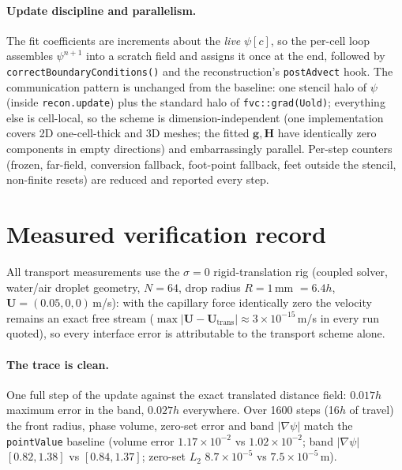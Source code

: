 \documentclass[preprint,3p,11pt]{elsarticle}
\newcommand{\psilev}{\psi}
\newcommand{\gv}{\mathbf{g}}
\newcommand{\Hm}{\mathbf{H}}
\newcommand{\gradpsi}{\lvert\nabla\psilev\rvert}
\begin{document}
\paragraph{Update discipline and parallelism.} The fit coefficients are
increments about the \emph{live} $\psilev[c]$, so the per-cell loop assembles
$\psilev^{n+1}$ into a scratch field and assigns it once at the end, followed
by \texttt{correctBoundaryConditions()} and the reconstruction's
\texttt{postAdvect} hook. The communication pattern is unchanged from the
baseline: one stencil halo of $\psilev$ (inside \texttt{recon.update}) plus
the standard halo of \texttt{fvc::grad(Uold)}; everything else is cell-local,
so the scheme is dimension-independent (one implementation covers 2D
one-cell-thick and 3D meshes; the fitted $\gv,\Hm$ have identically zero
components in empty directions) and embarrassingly parallel. Per-step counters
(frozen, far-field, conversion fallback, foot-point fallback, feet outside the
stencil, non-finite resets) are reduced and reported every step.

\section{Measured verification record}
\label{sec:results}

All transport measurements use the $\sigma=0$ rigid-translation rig (coupled
solver, water/air droplet geometry, $N=64$, drop radius $R=1$\,mm $=6.4h$,
$\mathbf U=(0.05,0,0)$\,m/s): with the capillary force identically zero the
velocity remains an exact free stream ($\max\lvert\mathbf U-\mathbf
U_{\mathrm{trans}}\rvert\approx3\times10^{-15}$\,m/s in every run quoted), so
every interface error is attributable to the transport scheme alone.

\paragraph{The trace is clean.} One full step of the update against the exact
translated distance field: $0.017h$ maximum error in the band, $0.027h$
everywhere. Over 1600 steps (16$h$ of travel) the front radius, phase volume,
zero-set error and band $\gradpsi$ match the \texttt{pointValue} baseline
(volume error $1.17\times10^{-2}$ vs $1.02\times10^{-2}$; band $\gradpsi$
$[0.82,1.38]$ vs $[0.84,1.37]$; zero-set $L_2$ $8.7\times10^{-5}$ vs
$7.5\times10^{-5}$\,m).
\end{document}
